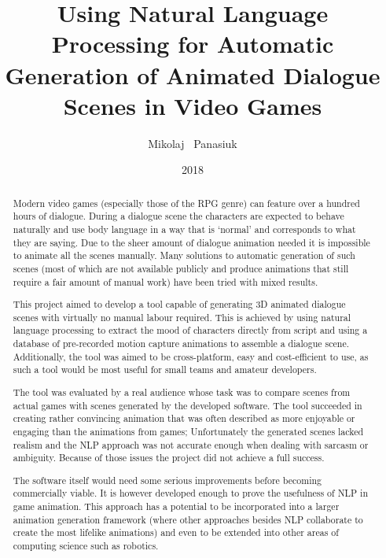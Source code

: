 \documentclass[phd]{abdnthesis}
\title{Using Natural Language Processing for Automatic Generation of Animated Dialogue Scenes in Video Games}
\author{Mikolaj \ Panasiuk}
\date{2018}
\begin{document}

\maketitle
\makedeclaration


\begin{abstract}
  Modern video games (especially those of the RPG genre) can feature over a hundred hours of dialogue. During a dialogue scene the characters are expected to behave naturally and use body language in a way that is `normal' and corresponds to what they are saying. Due to the sheer amount of dialogue animation needed it is impossible to animate all the scenes manually. Many solutions to automatic generation of such scenes (most of which are not available publicly and produce animations that still require a fair amount of manual work) have been tried with mixed results.
  
  This project aimed to develop a tool capable of generating 3D animated dialogue scenes with virtually no manual labour required. This is achieved by using natural language processing to extract the mood of characters directly from script and using a database of pre-recorded motion capture animations to assemble a dialogue scene. Additionally, the tool was aimed to be cross-platform, easy and cost-efficient to use, as such a tool would be most useful for small teams and amateur developers.
  
  The tool was evaluated by a real audience whose task was to compare scenes from actual games with scenes generated by the developed software. The tool succeeded in creating rather convincing animation that was often described as more enjoyable or engaging than the animations from games; Unfortunately the generated scenes lacked realism and the NLP approach was not accurate enough when dealing with sarcasm or ambiguity. Because of those issues the project did not achieve a full success.
  
  The software itself would need some serious improvements before becoming commercially viable. It is however developed enough to prove the usefulness of NLP in game animation. This approach has a potential to be incorporated into a larger animation generation framework (where other approaches besides NLP collaborate to create the most lifelike animations) and even to be extended into other areas of computing science such as robotics. 
\end{abstract}
\end{document}
